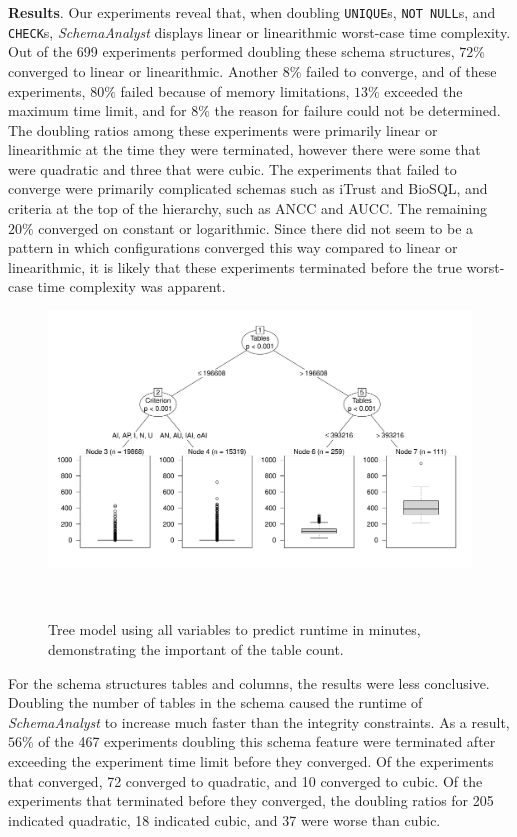 
\textbf{Results}. Our experiments reveal that, when doubling \texttt{UNIQUE}s, {\tt NOT NULL}s, and {\tt CHECK}s,
\textit{SchemaAnalyst} displays linear or linearithmic worst-case time complexity.  Out of the 699 experiments performed
doubling these schema structures, $72\%$ converged to linear or linearithmic.  Another $8\%$ failed to converge, and of
these experiments, $80\%$ failed because of memory limitations, $13\%$ exceeded the maximum time limit, and for $8\%$
the reason for failure could not be determined.  The doubling ratios among these experiments were primarily linear or
linearithmic at the time they were terminated, however there were some that were quadratic and three that were cubic.
The experiments that failed to converge were primarily complicated schemas such as iTrust and BioSQL, and criteria at
the top of the hierarchy, such as ANCC and AUCC. The remaining $20\%$ converged on constant or logarithmic.  Since there
did not seem to be a pattern in which configurations converged this way compared to linear or linearithmic, it is
likely that these experiments terminated before the true worst-case time complexity was apparent.

\begin{figure}[t]
\centering
  \centering
  \includegraphics[width=1.025\linewidth]{diagrams/AllTree.pdf}
  \vspace*{-.25in}
  \caption{Tree model using all variables to predict runtime in minutes, demonstrating the important of the table count.
  \vspace{-.315in}}~\label{fig:atree}
\end{figure}

For the schema structures tables and columns, the results were less conclusive. Doubling the number of tables in the
schema caused the runtime of \textit{SchemaAnalyst} to increase much faster than the integrity constraints. As a result,
$56\%$ of the 467 experiments doubling this schema feature were terminated after exceeding the experiment time limit
before they converged.  Of the experiments that converged, 72 converged to quadratic, and 10 converged to cubic.  Of the
experiments that terminated before they converged, the doubling ratios for 205 indicated quadratic, 18 indicated cubic,
and 37 were worse than cubic.

